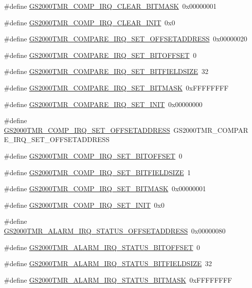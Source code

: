 \begin{DoxyCompactItemize}
\#define \hyperlink{a00556_a60a7e97bb62d53e34ad21a13e060b589}{GS2000TMR\_\-COMP\_\-IRQ\_\-CLEAR\_\-BITMASK}~0x00000001
\item 
\#define \hyperlink{a00556_a039eee791767aabb6f2af65a046e4d5d}{GS2000TMR\_\-COMP\_\-IRQ\_\-CLEAR\_\-INIT}~0x0
\item 
\#define \hyperlink{a00556_a387e8a2eeb402c47b642637065d78c0a}{GS2000TMR\_\-COMPARE\_\-IRQ\_\-SET\_\-OFFSETADDRESS}~0x00000020
\item 
\#define \hyperlink{a00556_ab61b17eda0b37af81d6d94c8315292f4}{GS2000TMR\_\-COMPARE\_\-IRQ\_\-SET\_\-BITOFFSET}~0
\item 
\#define \hyperlink{a00556_a868646bde04483a3ad7d7664c4a9eb7d}{GS2000TMR\_\-COMPARE\_\-IRQ\_\-SET\_\-BITFIELDSIZE}~32
\item 
\#define \hyperlink{a00556_ad4cf0180c350ababbdfac1ff5dade9ea}{GS2000TMR\_\-COMPARE\_\-IRQ\_\-SET\_\-BITMASK}~0xFFFFFFFF
\item 
\#define \hyperlink{a00556_a4b188c41dc9503e8960cb89385f0bd5c}{GS2000TMR\_\-COMPARE\_\-IRQ\_\-SET\_\-INIT}~0x00000000
\item 
\#define \hyperlink{a00556_a464f6265d53e9abd4c309f6f86db108f}{GS2000TMR\_\-COMP\_\-IRQ\_\-SET\_\-OFFSETADDRESS}~GS2000TMR\_\-COMPARE\_\-IRQ\_\-SET\_\-OFFSETADDRESS
\item 
\#define \hyperlink{a00556_aed3f111e7c12d5369bf6845ca96f777b}{GS2000TMR\_\-COMP\_\-IRQ\_\-SET\_\-BITOFFSET}~0
\item 
\#define \hyperlink{a00556_adb17a5f7c82c6b2b158bc4919e67c275}{GS2000TMR\_\-COMP\_\-IRQ\_\-SET\_\-BITFIELDSIZE}~1
\item 
\#define \hyperlink{a00556_ae4b98abe12119f8b8037c4aa08f257a1}{GS2000TMR\_\-COMP\_\-IRQ\_\-SET\_\-BITMASK}~0x00000001
\item 
\#define \hyperlink{a00556_a6f911f373e0830a73fbe82bb11095e9c}{GS2000TMR\_\-COMP\_\-IRQ\_\-SET\_\-INIT}~0x0
\item 
\#define \hyperlink{a00556_a863880ce7a24fb824d7bbcfafa7f55fa}{GS2000TMR\_\-ALARM\_\-IRQ\_\-STATUS\_\-OFFSETADDRESS}~0x00000080
\item 
\#define \hyperlink{a00556_a92ebb08fbc82acff3744667a1bd8d720}{GS2000TMR\_\-ALARM\_\-IRQ\_\-STATUS\_\-BITOFFSET}~0
\item 
\#define \hyperlink{a00556_abe9437839e1d569cf708258a0cb74777}{GS2000TMR\_\-ALARM\_\-IRQ\_\-STATUS\_\-BITFIELDSIZE}~32
\item 
\#define \hyperlink{a00556_a711529ab6d39d946815edc00c4a946aa}{GS2000TMR\_\-ALARM\_\-IRQ\_\-STATUS\_\-BITMASK}~0xFFFFFFFF

\end{DoxyCompactItemize}
